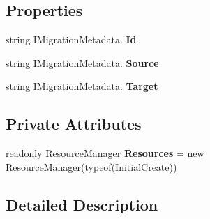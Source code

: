 \subsection*{Properties}
\begin{DoxyCompactItemize}
\item 
string I\+Migration\+Metadata. {\bfseries Id}\hypertarget{class_p_c_builder_m_v_c_1_1_migrations_1_1_initial_create_a6f9793a927dbeb219230374d3005eba3}{}\label{class_p_c_builder_m_v_c_1_1_migrations_1_1_initial_create_a6f9793a927dbeb219230374d3005eba3}

\item 
string I\+Migration\+Metadata. {\bfseries Source}\hypertarget{class_p_c_builder_m_v_c_1_1_migrations_1_1_initial_create_a3b3d2461ddd6849256eef839035d38f8}{}\label{class_p_c_builder_m_v_c_1_1_migrations_1_1_initial_create_a3b3d2461ddd6849256eef839035d38f8}

\item 
string I\+Migration\+Metadata. {\bfseries Target}\hypertarget{class_p_c_builder_m_v_c_1_1_migrations_1_1_initial_create_aed09fd7f64406fc05ecebf1f10291f18}{}\label{class_p_c_builder_m_v_c_1_1_migrations_1_1_initial_create_aed09fd7f64406fc05ecebf1f10291f18}

\end{DoxyCompactItemize}
\subsection*{Private Attributes}
\begin{DoxyCompactItemize}
\item 
readonly Resource\+Manager {\bfseries Resources} = new Resource\+Manager(typeof(\hyperlink{class_p_c_builder_m_v_c_1_1_migrations_1_1_initial_create}{Initial\+Create}))\hypertarget{class_p_c_builder_m_v_c_1_1_migrations_1_1_initial_create_ac240ed5b2227a317b3b714c34ab01538}{}\label{class_p_c_builder_m_v_c_1_1_migrations_1_1_initial_create_ac240ed5b2227a317b3b714c34ab01538}

\end{DoxyCompactItemize}


\subsection{Detailed Description}


